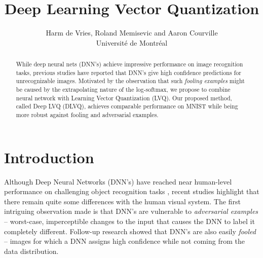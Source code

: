 \documentclass{esannV2}
\begin{document}
\title{Deep Learning Vector Quantization}

\author{Harm de Vries, Roland Memisevic and Aaron Courville
%
%
\vspace{.3cm}\\
%
Universit\'{e} de Montr\'{e}al \\
%
}

\maketitle

\begin{abstract}
While deep neural nets (DNN's) achieve impressive performance on image recognition tasks, previous studies have reported that DNN's give high confidence predictions for unrecognizable images. Motivated by the observation that such \emph{fooling examples} might be caused by the extrapolating nature of the log-softmax, we propose to combine neural network with Learning Vector Quantization (LVQ). Our proposed method, called Deep LVQ (DLVQ), achieves comparable performance on MNIST while being more robust against fooling and adversarial examples.
\end{abstract}

\section{Introduction}
Although Deep Neural Networks (DNN's) \cite{DBLP:journals/corr/abs-1206-5538} have reached near human-level performance on challenging object recognition tasks \cite{krizhevsky2012imagenet,DBLP:journals/corr/IoffeS15}, recent studies  highlight that there remain quite some differences with the human visual system. The first intriguing observation made is that DNN's are vulnerable to \emph{adversarial examples} \cite{DBLP:journals/corr/SzegedyZSBEGF13} -- worst-case, imperceptible changes to the input that causes the DNN to label it completely different. Follow-up research \cite{DBLP:journals/corr/NguyenYC14} showed that DNN's are also easily \emph{fooled} -- images for which a DNN assigns high confidence while not coming from the data distribution. 
\end{document}

